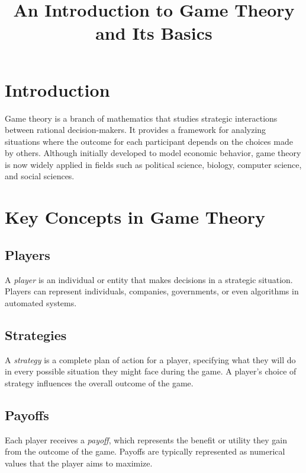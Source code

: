 \documentclass[a4paper,12pt]{article}
\title{An Introduction to Game Theory and Its Basics}
\author{}
\date{}
\begin{document}
\maketitle

\section*{Introduction}
Game theory is a branch of mathematics that studies strategic interactions between rational decision-makers. It provides a framework for analyzing situations where the outcome for each participant depends on the choices made by others. Although initially developed to model economic behavior, game theory is now widely applied in fields such as political science, biology, computer science, and social sciences.

\section*{Key Concepts in Game Theory}

\subsection*{Players}
A \textit{player} is an individual or entity that makes decisions in a strategic situation. Players can represent individuals, companies, governments, or even algorithms in automated systems.

\subsection*{Strategies}
A \textit{strategy} is a complete plan of action for a player, specifying what they will do in every possible situation they might face during the game. A player’s choice of strategy influences the overall outcome of the game.

\subsection*{Payoffs}
Each player receives a \textit{payoff}, which represents the benefit or utility they gain from the outcome of the game. Payoffs are typically represented as numerical values that the player aims to maximize.
\end{document}
